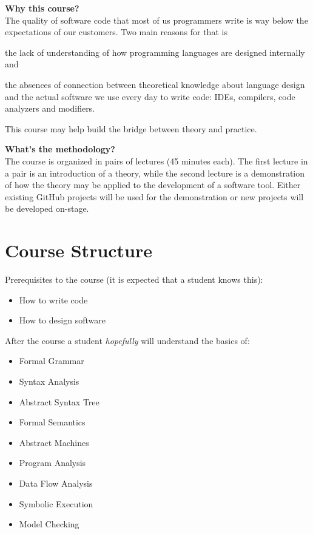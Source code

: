 \documentclass[nobrand,anonymous,nodate,nosecurity]{huawei}
\begin{document}
{\textbf{Why this course?}\\
The quality of software code that most of us programmers write is way below
the expectations of our customers. Two main reasons for that
is \begin{inparaenum}[a)]
\item the lack of understanding of how programming languages are designed
internally and
\item the absences of connection between theoretical knowledge
about language design and the actual software we use every day to
write code: IDEs, compilers, code analyzers and modifiers.\end{inparaenum}
This course may help build the bridge between theory and practice.

\textbf{What's the methodology?}\\
The course is organized in pairs of lectures (45 minutes each). The first lecture in a pair
is an introduction of a theory, while the second lecture is a demonstration
of how the theory may be applied to the development of a software tool.
Either existing GitHub projects will be used for the demonstration
or new projects will be developed on-stage.

\newpage
\section*{Course Structure}

Prerequisites to the course (it is expected that a student knows this):

\begin{itemize}
\item How to write code
\item How to design software
\end{itemize}

After the course a student \emph{hopefully} will understand the basics of:

\begin{itemize}
\item Formal Grammar
\item Syntax Analysis
\item Abstract Syntax Tree
\item Formal Semantics
\item Abstract Machines
\item Program Analysis
\item Data Flow Analysis
\item Symbolic Execution
\item Model Checking
\end{itemize}

}
\end{document}
